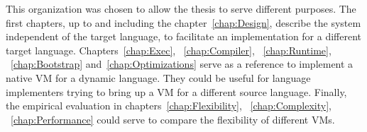 This organization was chosen to allow the thesis to serve different purposes.
The first chapters, up to and including the chapter~\ref{chap:Design}, describe
the system independent of the target language, to facilitate an implementation
for a different target language.   Chapters~\ref{chap:Exec}, ~\ref{chap:Compiler},
~\ref{chap:Runtime}, ~\ref{chap:Bootstrap} and~\ref{chap:Optimizations} serve as a reference to implement
a native VM for a dynamic language. They could be useful for language
implementers trying to bring up a VM for a different source language. Finally,
the empirical evaluation in chapters~\ref{chap:Flexibility},
~\ref{chap:Complexity}, ~\ref{chap:Performance} could serve to compare the
flexibility of different VMs.
